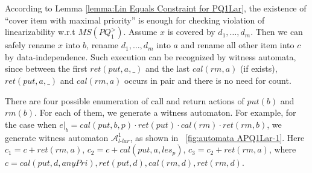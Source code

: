 According to Lemma \ref{lemma:Lin Equals Constraint for PQ1Lar}, the existence of ``cover item with maximal priority'' is enough for checking violation of linearizability w.r.t $\textit{MS}(\textit{PQ}_1^{>})$. Assume $x$ is covered by $d_1,\ldots,d_m$. Then we can safely rename $x$ into $b$, rename $d_1,\ldots,d_m$ into $a$ and rename all other item into $c$ by data-independence. Such execution can be recognized by witness automata, since between the first $\textit{ret}(\textit{put},a,\_)$ and the last $\textit{cal}(\textit{rm},a)$ (if exists), $\textit{ret}(\textit{put},a,\_)$ and $\textit{cal}(\textit{rm},a)$ occurs in pair and there is no need for count.

There are four possible enumeration of call and return actions of $\textit{put}(b)$ and $\textit{rm}(b)$. For each of them, we generate a witness automaton. For example, for the case when $e \vert_{b} = \textit{cal}(\textit{put},b,p) \cdot \textit{ret}(\textit{put}) \cdot \textit{cal}(\textit{rm}) \cdot \textit{ret}(\textit{rm},b)$, we generate witness automaton $\mathcal{A}_{\textit{l-lar}}^1$, as shown in \figurename~\ref{fig:automata APQ1Lar-1}. Here $c_1 = c + \textit{ret}(\textit{rm},a)$, $c_2 = c + \textit{cal}(\textit{put},a,\textit{les}_p)$, $c_3 = c_2 + \textit{ret}(\textit{rm},a)$, where $c = \textit{cal}(\textit{put},d,\textit{anyPri}),\textit{ret}(\textit{put},d), \textit{cal}(\textit{rm},d), \textit{ret}(\textit{rm},d)$.

